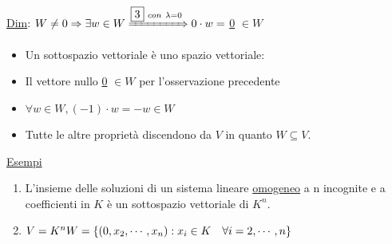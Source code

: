 \documentclass{article}
\newcommand{\ul}[1]{\underline{#1}}
\begin{document}
\ul{Dim}: $W\not=0\Rightarrow\exists w\in W\xRightarrow{\boxed{3}\ con\ \lambda=0}0\cdot w=$ \ul{0} $\in W$
\begin{itemize}
	\item Un sottospazio vettoriale è uno spazio vettoriale:
	\item Il vettore nullo \ul{0} $\in W$ per l'osservazione precedente
	\item $\forall w\in W,(-1)\cdot w=-w\in W$
	\item Tutte le altre proprietà discendono da $V$ in quanto $W\subseteq V$.
\end{itemize}

\ul{Esempi}
\begin{enumerate}
	\item L'insieme delle soluzioni di un sistema lineare \ul{omogeneo} a n incognite e a coefficienti in $K$ è un sottospazio vettoriale di $K^n$.
	\item $V=K^n\\W=\{(0,x_2,\cdots,x_n):x_i\in K\quad\forall i=2,\cdots,n\}$
\end{enumerate}
\end{document}
